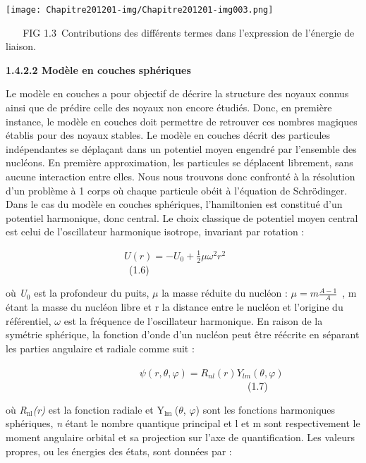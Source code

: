 \documentclass[a4paper]{article}
\providecommand\textsubscript[1]{\ensuremath{{}_{\text{#1}}}}
\begin{document}
 \texttt{[image: Chapitre201201-img/Chapitre201201-img003.png]} 

\textbf{\ \ \ }FIG 1.3~Contributions des différents termes dans l’expression de l’énergie de liaison.\textbf{ }


\bigskip

\textbf{1.4.2.2 Modèle en couches sphériques}

Le modèle en couches a pour objectif de décrire la structure des noyaux connus ainsi que de prédire celle des noyaux non
encore étudiés. Donc, en première instance, le modèle en couches doit permettre de retrouver ces nombres magiques
établis pour des\textbf{ }noyaux stables. Le modèle en couches décrit des particules indépendantes se déplaçant dans un
potentiel moyen engendré par l’ensemble des nucléons. En première approximation, les particules se déplacent librement,
sans aucune interaction entre elles. Nous nous trouvons donc confronté à la résolution d’un problème à 1 corps où
chaque particule obéit à l’équation de Schrödinger. Dans le cas du modèle en couches sphériques, l’hamiltonien est
constitué d’un potentiel harmonique, donc central. Le choix classique de potentiel moyen central est celui de
l’oscillateur harmonique isotrope, invariant par rotation : ${}$

\ \ \ \ \ \ \ \ \ \ \ \ \ \ \ \ \ \ \ \ \ \ \ \  $U\left(r\right)=-U_0+\frac 1 2\mu \omega
^2r^2$\ \ \ \ \ \ \ \ \ \ \ \ \ \ \ \ \ \ \ \ \ \ \ \ \ (1.6)


\bigskip

où \textit{U}\textsubscript{0} est la profondeur du puits, $\mu $ la masse réduite du nucléon :  $\mu =m\frac{A-1} A$\ ,
m étant la masse du nucléon libre et r la distance entre le nucléon et l’origine du référentiel, $\omega $ est la
fréquence de l’oscillateur harmonique. En raison de la symétrie sphérique, la fonction d’onde d’un nucléon peut être
réécrite en séparant les parties angulaire et radiale comme suit :

\textbf{\ \ \ \ \ \ \ \ \ \ \ \ \ \ \ \ \ \ \ \ \ \ \ } $\psi \left(r,\theta ,\varphi
\right)=R_{\mathit{nl}}(r)Y_{\mathit{lm}}(\theta ,\varphi
)$\ \ \ \ \ \ \ \ \ \ \ \ \ \ \ \ \ \ \ \ \ \ \ \ \ \ \ \ \ \ \ \ \ \ \ \ \ \ \ \ \ \ \ \ \ \ \ \ \ (1.7)


\bigskip

où \textit{R}\textit{\textsubscript{nl}}\textit{(r)} est la fonction radiale et Y\textit{\textsubscript{lm }}($\theta $,
$\varphi $) sont les fonctions harmoniques sphériques, \textit{n} étant le nombre quantique principal et l et m sont
respectivement le moment angulaire orbital et sa projection sur l’axe de quantification. Les valeurs propres, ou les
énergies des états, sont données par :
\end{document}
